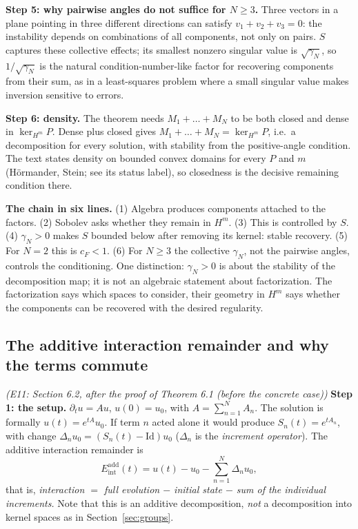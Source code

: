 \documentclass[11pt]{article}
\theoremstyle{plain}
\theoremstyle{definition}
\theoremstyle{remark}
\newcommand{\Id}{\mathrm{Id}}
\newcommand{\Eint}{E_{\mathrm{int}}}        %
\begin{document}
\medskip\textbf{Step 5: why pairwise angles do not suffice for $N\ge3$.} Three vectors in a plane pointing in three different directions can satisfy $v_1+v_2+v_3=0$: the instability depends on combinations of all components, not only on pairs. $S$ captures these collective effects; its smallest nonzero singular value is $\sqrt{\gamma_N}$, so $1/\sqrt{\gamma_N}$ is the natural condition-number-like factor for recovering components from their sum, as in a least-squares problem where a small singular value makes inversion sensitive to errors.

\medskip\textbf{Step 6: density.} The theorem needs $M_1+\dots+M_N$ to be both closed and dense in $\ker_{H^m}P$. Dense plus closed gives $M_1+\dots+M_N=\ker_{H^m}P$, i.e.\ a decomposition for every solution, with stability from the positive-angle condition. The text states density on bounded convex domains for every $P$ and $m$ (H\"ormander, Stein; see its status label), so closedness is the decisive remaining condition there.

\medskip\textbf{The chain in six lines.} (1) Algebra produces components attached to the factors. (2) Sobolev asks whether they remain in $H^m$. (3) This is controlled by $S$. (4) $\gamma_N>0$ makes $S$ bounded below after removing its kernel: stable recovery. (5) For $N=2$ this is $c_F<1$. (6) For $N\ge3$ the collective $\gamma_N$, not the pairwise angles, controls the conditioning. One distinction: $\gamma_N>0$ is about the stability of the decomposition map; it is not an algebraic statement about factorization. The factorization says which spaces to consider, their geometry in $H^m$ says whether the components can be recovered with the desired regularity.

\subsection{The additive interaction remainder and why the terms commute}\label{expl:E11}
\noindent\emph{(E11: Section 6.2, after the proof of Theorem 6.1 (before the concrete case))}
\textbf{Step 1: the setup.} $\partial_tu=Au$, $u(0)=u_0$, with $A=\sum_{n=1}^NA_n$. The solution is formally $u(t)=e^{tA}u_0$. If term $n$ acted alone it would produce $S_n(t)=e^{tA_n}$, with change $\Delta_nu_0=(S_n(t)-\Id)u_0$ ($\Delta_n$ is the \emph{increment operator}). The additive interaction remainder is
\[
\Eint^{\mathrm{add}}(t)=u(t)-u_0-\sum_{n=1}^N\Delta_nu_0,
\]
that is, \emph{interaction $=$ full evolution $-$ initial state $-$ sum of the individual increments.}
Note that this is an additive decomposition, \emph{not} a decomposition into kernel spaces as in Section~\ref{sec:groups}.
\end{document}

